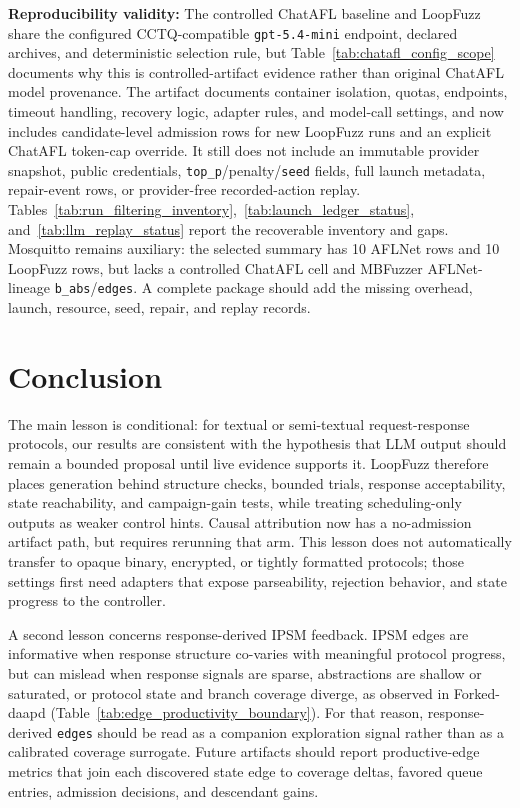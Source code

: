 \documentclass[final,5p,times,number]{elsarticle}
\begin{document}
\textbf{Reproducibility validity:} The controlled ChatAFL baseline and LoopFuzz share the configured CCTQ-compatible \texttt{gpt-5.4-mini} endpoint, declared archives, and deterministic selection rule, but Table~\ref{tab:chatafl_config_scope} documents why this is controlled-artifact evidence rather than original ChatAFL model provenance. The artifact documents container isolation, quotas, endpoints, timeout handling, recovery logic, adapter rules, and model-call settings, and now includes candidate-level admission rows for new LoopFuzz runs and an explicit ChatAFL token-cap override. It still does not include an immutable provider snapshot, public credentials, \texttt{top\_p}/penalty/\texttt{seed} fields, full launch metadata, repair-event rows, or provider-free recorded-action replay. Tables~\ref{tab:run_filtering_inventory},~\ref{tab:launch_ledger_status}, and~\ref{tab:llm_replay_status} report the recoverable inventory and gaps. Mosquitto remains auxiliary: the selected summary has 10 AFLNet rows and 10 LoopFuzz rows, but lacks a controlled ChatAFL cell and MBFuzzer AFLNet-lineage \texttt{b\_abs}/\texttt{edges}. A complete package should add the missing overhead, launch, resource, seed, repair, and replay records.

\section{Conclusion}
The main lesson is conditional: for textual or semi-textual request-response protocols, our results are consistent with the hypothesis that LLM output should remain a bounded proposal until live evidence supports it. LoopFuzz therefore places generation behind structure checks, bounded trials, response acceptability, state reachability, and campaign-gain tests, while treating scheduling-only outputs as weaker control hints. Causal attribution now has a no-admission artifact path, but requires rerunning that arm. This lesson does not automatically transfer to opaque binary, encrypted, or tightly formatted protocols; those settings first need adapters that expose parseability, rejection behavior, and state progress to the controller.

A second lesson concerns response-derived IPSM feedback. IPSM edges are informative when response structure co-varies with meaningful protocol progress, but can mislead when response signals are sparse, abstractions are shallow or saturated, or protocol state and branch coverage diverge, as observed in Forked-daapd (Table~\ref{tab:edge_productivity_boundary}). For that reason, response-derived \texttt{edges} should be read as a companion exploration signal rather than as a calibrated coverage surrogate. Future artifacts should report productive-edge metrics that join each discovered state edge to coverage deltas, favored queue entries, admission decisions, and descendant gains.
\end{document}
